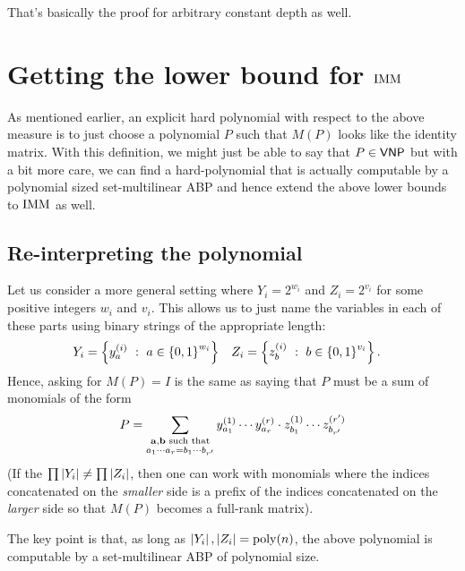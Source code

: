 That's basically the proof for arbitrary constant depth as well.\\


\section{Getting the lower bound for $\operatorname{\mathrm{IMM}}$}

As mentioned earlier, an explicit hard polynomial with respect to the above measure is to just choose a polynomial $P$ such that $M(P)$ looks like the identity matrix. With this definition, we might just be able to say that $P \in \mathsf{VNP}$ but with a bit more care, we can find a hard-polynomial that is actually computable by a polynomial sized set-multilinear ABP and hence extend the above lower bounds to $\operatorname{\mathrm{IMM}}$ as well.

\subsection{Re-interpreting the polynomial}

Let us consider a more general setting where $Y_i = 2^{w_i}$ and $Z_i = 2^{v_i}$ for some positive integers $w_i$ and $v_i$. This allows us to just name the variables in each of these parts using binary strings of the appropriate length:
\begin{align*}
  Y_i &= \left\{{y_{a}^{(i)}}\ : \ {a \in \left\{0,1\right\}^{w_i}}\right\}&
  Z_i &= \left\{{z_{b}^{(i)}}\ : \ {b \in \left\{0,1\right\}^{v_i}}\right\}.
\end{align*}
Hence, asking for $M(P) = I$ is the same as saying that $P$ must be a sum of monomials of the form
\[
  P = \sum_{\substack{\mathbf{a},\mathbf{b} \text{ such that}\\a_1\cdots a_r = b_1 \cdots b_{r'}}}y_{a_1}^{(1)} \cdots y_{a_r}^{(r)} \cdot z_{b_1}^{(1)} \cdots z_{b_{r'}}^{(r')}
\]
(If the $\prod \left|Y_i\right| \neq \prod \left|Z_i\right|$, then one can work with monomials where the indices concatenated on the \emph{smaller} side is a prefix of the indices concatenated on the \emph{larger} side so that $M(P)$ becomes a full-rank matrix).

The key point is that, as long as $\left|Y_i\right|, \left|Z_i\right| = \operatorname{poly}(n)$, the above polynomial is computable by a set-multilinear ABP of polynomial size.


